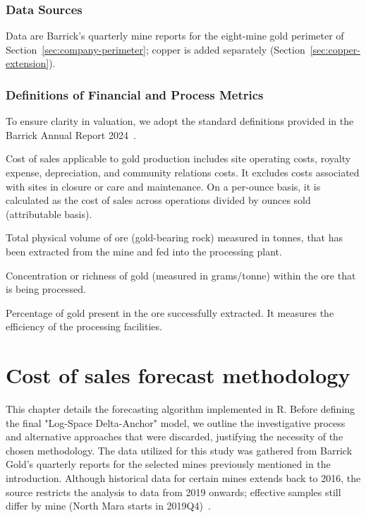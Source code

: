 \subsubsection{Data Sources}
Data are Barrick's quarterly mine reports for the eight-mine gold perimeter of
Section~\ref{sec:company-perimeter}; copper is added separately
(Section~\ref{sec:copper-extension}).
\subsubsection{Definitions of Financial and Process Metrics}
To ensure clarity in valuation, we adopt the standard definitions provided in the Barrick Annual Report 2024~\cite{barrick-ar-2024}.

\begin{definition}
Cost of sales applicable to gold production includes site operating costs, royalty expense, depreciation, and community relations costs. It excludes costs associated with sites in closure or care and maintenance. On a per-ounce basis, it is calculated as the cost of sales across operations divided by ounces sold (attributable basis).
\end{definition}


\begin{definition}
Total physical volume of ore (gold-bearing rock) measured in tonnes, that has been extracted from the mine and fed into the processing plant.
\end{definition}

\begin{definition}
Concentration or richness of gold (measured in grams/tonne) within the ore that is being processed.
\end{definition}

\begin{definition}
Percentage of gold present in the ore successfully extracted. It measures the efficiency of the processing facilities.
\end{definition}

\section{Cost of sales forecast methodology}
This chapter details the forecasting algorithm implemented in R. Before defining the final "Log-Space Delta-Anchor" model, we outline the investigative process and alternative approaches that were discarded, justifying the necessity of the chosen methodology. The data utilized for this study was gathered from Barrick Gold's quarterly reports for the selected mines previously mentioned in the introduction. Although historical data for certain mines extends back to 2016, the source restricts the analysis to data from 2019 onwards; effective samples still differ by mine (North Mara starts in 2019Q4)~\cite{team4}.

